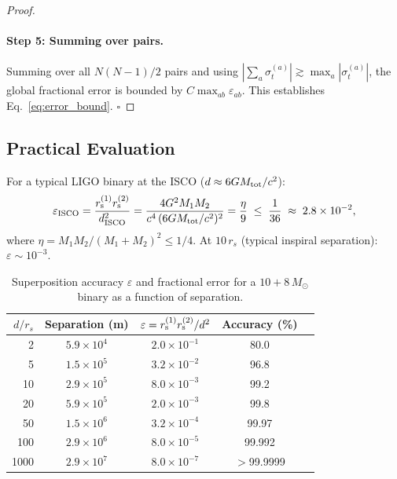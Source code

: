 \documentclass[11pt,a4paper]{article}
\theoremstyle{definition}
\theoremstyle{remark}
\newcommand{\rs}[1]{r_{\rm s}^{(#1)}}
\newcommand{\sig}[2]{\sigma_{#1}^{(#2)}}
\begin{document}
\begin{proof}
		\paragraph{Step 5: Summing over pairs.}
		Summing over all $N(N-1)/2$ pairs and using
		$|\sum_a\sig{t}{a}|\gtrsim\max_a|\sig{t}{a}|$, the global fractional
		error is bounded by $C\max_{ab}\varepsilon_{ab}$.  This establishes
		Eq.~\eqref{eq:error_bound}. \hfill$\square$
	\end{proof}
	
	\subsection{Practical Evaluation}
	
	For a typical LIGO binary at the ISCO ($d\approx6GM_{\rm tot}/c^2$):
	\begin{equation}
		\varepsilon_{\rm ISCO}
		= \frac{\rs{1}\rs{2}}{d_{\rm ISCO}^2}
		= \frac{4G^2M_1M_2}{c^4\,(6GM_{\rm tot}/c^2)^2}
		= \frac{\eta}{9}
		\;\leq\;
		\frac{1}{36}
		\;\approx\; 2.8\times10^{-2},
		\label{eq:isco_bound}
	\end{equation}
	where $\eta=M_1M_2/(M_1+M_2)^2\leq1/4$.
	At $10\,r_s$ (typical inspiral separation):
	$\varepsilon\sim10^{-3}$.
	
	\begin{table}[ht]
		\centering
		\caption{Superposition accuracy $\varepsilon$ and fractional error
			for a $10+8\,M_\odot$ binary as a function of separation.}
		\label{tab:superposition}
		\renewcommand{\arraystretch}{1.3}
		\begin{tabular}{rcccc}
			\toprule
			$d/r_s$ & Separation (m) & $\varepsilon=\rs{1}\rs{2}/d^2$ & Accuracy (\%) \\
			\midrule
			2    & $5.9\times10^4$ & $2.0\times10^{-1}$ & 80.0 \\
			5    & $1.5\times10^5$ & $3.2\times10^{-2}$ & 96.8 \\
			10    & $2.9\times10^5$ & $8.0\times10^{-3}$ & 99.2 \\
			20    & $5.9\times10^5$ & $2.0\times10^{-3}$ & 99.8 \\
			50    & $1.5\times10^6$ & $3.2\times10^{-4}$ & 99.97 \\
			100    & $2.9\times10^6$ & $8.0\times10^{-5}$ & 99.992 \\
			1000    & $2.9\times10^7$ & $8.0\times10^{-7}$ & $>$99.9999 \\
			\bottomrule
		\end{tabular}
	\end{table}
	
\end{document}
